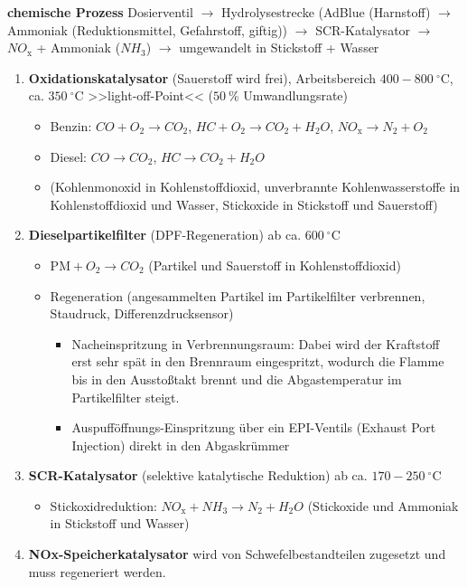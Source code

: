 \textbf{chemische Prozess} Dosierventil $\to$ Hydrolysestrecke (AdBlue
(Harnstoff) $\to$ Ammoniak (Reduktionsmittel, Gefahrstoff, giftig))
$\to$ SCR-Katalysator $\to$ $NO_\text{x}$ + Ammoniak
($NH_\text{3}$) $\to$ umgewandelt in Stickstoff + Wasser

\begin{enumerate}
\item
  \textbf{Oxidationskatalysator} (Sauerstoff wird frei), Arbeitsbereich
  $400 - 800~^\circ\text{C}$, ca. $350~^\circ\text{C}$
  >>light-off-Point<< ($50~\%$ Umwandlungsrate)

  \begin{itemize}
  \item
    Benzin: $CO + O_2 \to CO_2$, $HC + O_2 \to CO_2 + H_{2}O$,
    $NO_\text{x} \to N_2 + O_2$
  \item
    Diesel: $CO \to CO_2$, $HC \to CO_2 + H_{2}O$
  \item
    (Kohlenmonoxid in Kohlenstoffdioxid, unverbrannte Kohlenwasserstoffe
    in Kohlenstoffdioxid und Wasser, Stickoxide in Stickstoff und
    Sauerstoff)
  \end{itemize}
\item
  \textbf{Dieselpartikelfilter} (DPF-Regeneration) ab ca.
  $600~^\circ\text{C}$

  \begin{itemize}
  \item
    $\text{PM} + O_2 \to CO_{2}$ (Partikel und Sauerstoff in
    Kohlenstoffdioxid)
  \item
    Regeneration (angesammelten Partikel im Partikelfilter verbrennen,
    Staudruck, Differenzdrucksensor)

    \begin{itemize}
    \item
      Nacheinspritzung in Verbrennungsraum: Dabei wird der Kraftstoff
      erst sehr spät in den Brennraum eingespritzt, wodurch die Flamme
      bis in den Ausstoßtakt brennt und die Abgastemperatur im
      Partikelfilter steigt.
    \item
      Auspufföffnungs-Einspritzung über ein EPI-Ventils (Exhaust Port
      Injection) direkt in den Abgaskrümmer
    \end{itemize}
  \end{itemize}
\item
  \textbf{SCR-Katalysator} (selektive katalytische Reduktion) ab ca.
  $170 - 250~^\circ\text{C}$

  \begin{itemize}
  \item
    Stickoxidreduktion: $NO_\text{x} + NH_\text{3} \to N_2 + H_{2}O$
    (Stickoxide und Ammoniak in Stickstoff und Wasser)
  \end{itemize}
\item
  \textbf{NOx-Speicherkatalysator} wird von Schwefelbestandteilen
  zugesetzt und muss regeneriert werden.
\end{enumerate}

